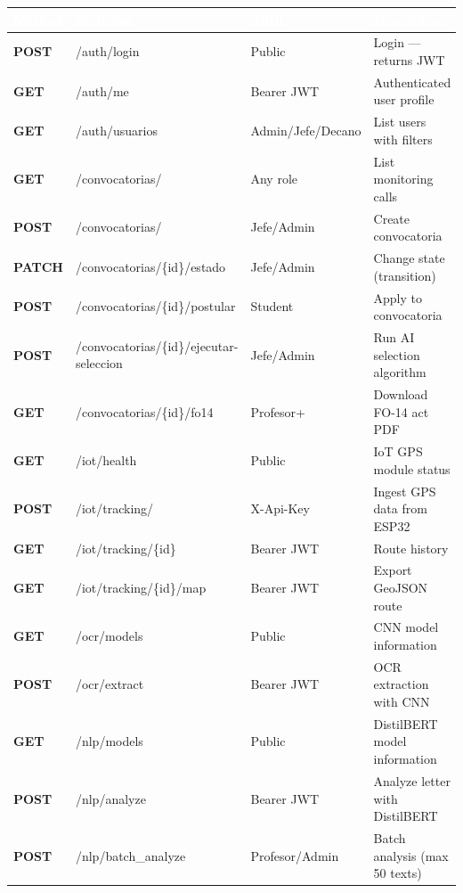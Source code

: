 \documentclass[12pt,a4paper,twoside]{report}
\begin{document}
\begin{center}
\begin{tabularx}{\textwidth}{|>{\bfseries}l|p{6.5cm}|p{3cm}|X|}
\hline
\rowcolor{tableHdr}
\textcolor{white}{\textbf{Method}} &
\textcolor{white}{\textbf{Endpoint}} &
\textcolor{white}{\textbf{Auth}} &
\textcolor{white}{\textbf{Description}} \\
\hline
\rowcolor{rowOdd}POST & /auth/login & Public & Login — returns JWT \\
\hline\rowcolor{rowEven}GET & /auth/me & Bearer JWT & Authenticated user profile \\
\hline\rowcolor{rowOdd}GET & /auth/usuarios & Admin/Jefe/Decano & List users with filters \\
\hline\rowcolor{rowEven}GET & /convocatorias/ & Any role & List monitoring calls \\
\hline\rowcolor{rowOdd}POST & /convocatorias/ & Jefe/Admin & Create convocatoria \\
\hline\rowcolor{rowEven}PATCH & /convocatorias/\{id\}/estado & Jefe/Admin & Change state (transition) \\
\hline\rowcolor{rowOdd}POST & /convocatorias/\{id\}/postular & Student & Apply to convocatoria \\
\hline\rowcolor{rowEven}POST & /convocatorias/\{id\}/ejecutar-seleccion & Jefe/Admin & Run AI selection algorithm \\
\hline\rowcolor{rowOdd}GET & /convocatorias/\{id\}/fo14 & Profesor+ & Download FO-14 act PDF \\
\hline\rowcolor{rowEven}GET & /iot/health & Public & IoT GPS module status \\
\hline\rowcolor{rowOdd}POST & /iot/tracking/ & X-Api-Key & Ingest GPS data from ESP32 \\
\hline\rowcolor{rowEven}GET & /iot/tracking/\{id\} & Bearer JWT & Route history \\
\hline\rowcolor{rowOdd}GET & /iot/tracking/\{id\}/map & Bearer JWT & Export GeoJSON route \\
\hline\rowcolor{rowEven}GET & /ocr/models & Public & CNN model information \\
\hline\rowcolor{rowOdd}POST & /ocr/extract & Bearer JWT & OCR extraction with CNN \\
\hline\rowcolor{rowEven}GET & /nlp/models & Public & DistilBERT model information \\
\hline\rowcolor{rowOdd}POST & /nlp/analyze & Bearer JWT & Analyze letter with DistilBERT \\
\hline\rowcolor{rowEven}POST & /nlp/batch\_analyze & Profesor/Admin & Batch analysis (max 50 texts) \\
\hline
\end{tabularx}
\end{center}
\end{document}
